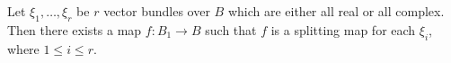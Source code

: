 Let $\xi_1, \ldots, \xi_r$ be $r$ vector bundles over $B$ which are either all real or all complex. Then there exists a map $f: B_1 \rightarrow B$ such that $f$ is a splitting map for each $\xi_i$, where $1 \leq i \leq r$.
